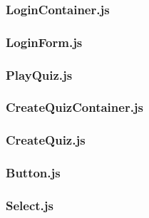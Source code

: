 \subsubsection{LoginContainer.js} %
\label{ssub:login_js}


\subsubsection{LoginForm.js} %
\label{ssub:loginform_js}


\subsubsection{PlayQuiz.js} %
\label{ssub:playquiz_js}


\subsubsection{CreateQuizContainer.js} %
\label{ssub:createquiz_js}


\subsubsection{CreateQuiz.js} %
\label{ssub:createquiz_js}


\subsubsection{Button.js} %
\label{ssub:yearselector_js}


\subsubsection{Select.js} %
\label{ssub:yearselector_js}


